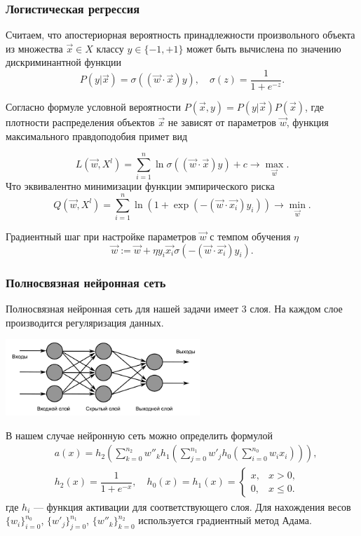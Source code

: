 \documentclass[compress,professionalfont]{beamer}
\begin{document}
\begin{frame}
\frametitle{Логистическая регрессия}
\small

Считаем, что апостериорная вероятность принадлежности произвольного объекта из множества $\vec{x} \in X$ классу $y \in \{-1, +1\}$ может быть вычислена по значению дискриминантной функции
$$
P(y|\vec{x}) = \sigma ((\vec{w} \cdot \vec{x}) y), \quad \sigma(z) = \dfrac{1}{1+ e^{-z}}.
$$

Согласно формуле условной вероятности $P(\vec{x},y) = P(y|\vec{x})P(\vec{x})$, где плотности распределения объектов $\vec{x}$ не зависят от параметров $\vec{w}$, функция максимального правдоподобия примет вид

$$
L\left(\vec{w}, X^l\right) =  \sum_{i=1}^{n} \ln \sigma((\vec{w} \cdot \vec{x})y) + c \rightarrow \max_{\vec{w}}.
$$
Что эквивалентно минимизации функции эмпирического риска
$$
Q\left(\vec{w}, X^l\right) = \sum_{i=1}^{n} \ln{\left(1 + \exp{(-(\vec{w} \cdot \vec{x_i})y_i)}\right)} \rightarrow \min_{\vec{w}}.
$$

Градиентный шаг при настройке параметров $\vec{w}$ с темпом обучения $\eta$
$$
\vec{w} := \vec{w} + \eta y_i \vec{x_i} \sigma(-(\vec{w} \cdot \vec{x_i})y_i).
$$

\end{frame}

\begin{frame}
\frametitle{Полносвязная нейронная сеть}
\small

Полносвязная нейронная сеть для нашей задачи имеет 3 слоя. На каждом слое производится регуляризация данных.

\begin{center}
\includegraphics[width=0.55\textwidth]{fcnn.png}
\end{center}

В нашем случае нейронную сеть можно определить формулой
\begin{align*}
& a(x) = h_2 \left(\sum_{k=0}^{n_2} w''_k h_1\left(\sum_{j=0}^{n_1} w'_j h_0\left( \sum_{i=0}^{n_0} w_i x_i \right)\right)\right), \\
& h_2(x) = \dfrac{1}{1+e^{-x}}, \quad h_0(x) = h_1(x) = 
\begin{cases} 
x, & x > 0, \\
0, & x \leqslant 0.
\end{cases}
\end{align*}
где $h_i$ --- функция активации для соответствующего слоя. Для нахождения весов $\{w_i\}_{i=0}^{n_0}$, $\{w'_j\}_{j=0}^{n_1}$, $\{w''_k\}_{k=0}^{n_2}$ используется градиентный метод Адама.

\end{frame}
\end{document}

